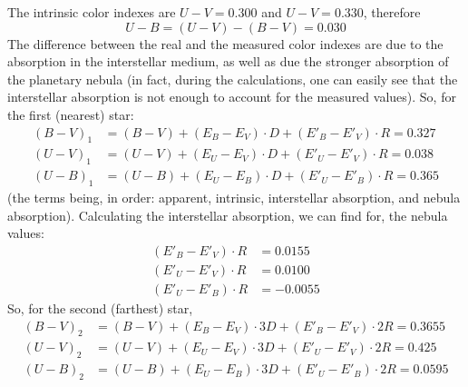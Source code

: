 The intrinsic color indexes are $U - V = 0.300$
and $U - V = 0.330$, therefore
\[
U - B = (U - V) - (B - V) = 0.030
\]
The difference between the real and the measured color indexes are due to the
absorption in the interstellar medium, as well as due the stronger absorption
of the planetary nebula (in fact, during the calculations, one can easily see
that the interstellar absorption is not enough to account for the measured
values). So, for the first (nearest) star:
\begin{align*}
(B-V)_1 &= (B-V) + (E_B - E_V)\cdot D + (E'_B - E'_V)\cdot R = 0.327\\
(U-V)_1 &= (U-V) + (E_U - E_V)\cdot D + (E'_U - E'_V)\cdot R = 0.038\\
(U-B)_1 &= (U-B) + (E_U - E_B)\cdot D + (E'_U - E'_B)\cdot R = 0.365
\tag*{(3 pt)}
\end{align*}
(the terms being, in order: apparent, intrinsic, interstellar absorption, and
nebula absorption). Calculating the interstellar absorption, we can find for,
the nebula values:
\begin{align*}
(E'_B - E'_V)\cdot R &= 0.0155\\
(E'_U - E'_V)\cdot R &= 0.0100\\
(E'_U - E'_B)\cdot R &= -0.0055 \tag*{(1 pt)}
\end{align*}
So, for the second (farthest) star,
\begin{align*}
(B-V)_2 &= (B-V) + (E_B - E_V)\cdot 3D + (E'_B - E'_V)\cdot 2R = \mathbf{0.3655}\\
(U-V)_2 &= (U-V) + (E_U - E_V)\cdot 3D + (E'_U - E'_V)\cdot 2R = \mathbf{0.425}\\
(U-B)_2 &= (U-B) + (E_U - E_B)\cdot 3D + (E'_U - E'_B)\cdot 2R = \mathbf{0.0595}
\tag*{(4 pt)}
\end{align*}
